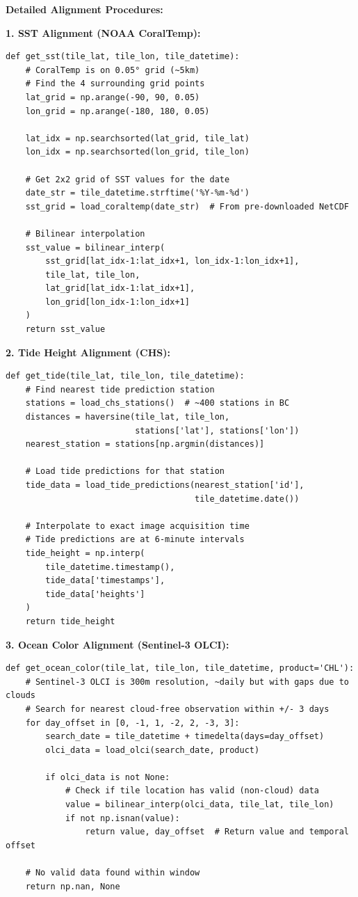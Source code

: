 \documentclass[11pt]{article}
\begin{document}
\textbf{Detailed Alignment Procedures:}

\textbf{1. SST Alignment (NOAA CoralTemp):}

\begin{verbatim}
def get_sst(tile_lat, tile_lon, tile_datetime):
    # CoralTemp is on 0.05° grid (~5km)
    # Find the 4 surrounding grid points
    lat_grid = np.arange(-90, 90, 0.05)
    lon_grid = np.arange(-180, 180, 0.05)

    lat_idx = np.searchsorted(lat_grid, tile_lat)
    lon_idx = np.searchsorted(lon_grid, tile_lon)

    # Get 2x2 grid of SST values for the date
    date_str = tile_datetime.strftime('%Y-%m-%d')
    sst_grid = load_coraltemp(date_str)  # From pre-downloaded NetCDF

    # Bilinear interpolation
    sst_value = bilinear_interp(
        sst_grid[lat_idx-1:lat_idx+1, lon_idx-1:lon_idx+1],
        tile_lat, tile_lon,
        lat_grid[lat_idx-1:lat_idx+1],
        lon_grid[lon_idx-1:lon_idx+1]
    )
    return sst_value
\end{verbatim}

\textbf{2. Tide Height Alignment (CHS):}

\begin{verbatim}
def get_tide(tile_lat, tile_lon, tile_datetime):
    # Find nearest tide prediction station
    stations = load_chs_stations()  # ~400 stations in BC
    distances = haversine(tile_lat, tile_lon,
                          stations['lat'], stations['lon'])
    nearest_station = stations[np.argmin(distances)]

    # Load tide predictions for that station
    tide_data = load_tide_predictions(nearest_station['id'],
                                      tile_datetime.date())

    # Interpolate to exact image acquisition time
    # Tide predictions are at 6-minute intervals
    tide_height = np.interp(
        tile_datetime.timestamp(),
        tide_data['timestamps'],
        tide_data['heights']
    )
    return tide_height
\end{verbatim}

\textbf{3. Ocean Color Alignment (Sentinel-3 OLCI):}

\begin{verbatim}
def get_ocean_color(tile_lat, tile_lon, tile_datetime, product='CHL'):
    # Sentinel-3 OLCI is 300m resolution, ~daily but with gaps due to clouds
    # Search for nearest cloud-free observation within +/- 3 days
    for day_offset in [0, -1, 1, -2, 2, -3, 3]:
        search_date = tile_datetime + timedelta(days=day_offset)
        olci_data = load_olci(search_date, product)

        if olci_data is not None:
            # Check if tile location has valid (non-cloud) data
            value = bilinear_interp(olci_data, tile_lat, tile_lon)
            if not np.isnan(value):
                return value, day_offset  # Return value and temporal offset

    # No valid data found within window
    return np.nan, None
\end{verbatim}
\end{document}
